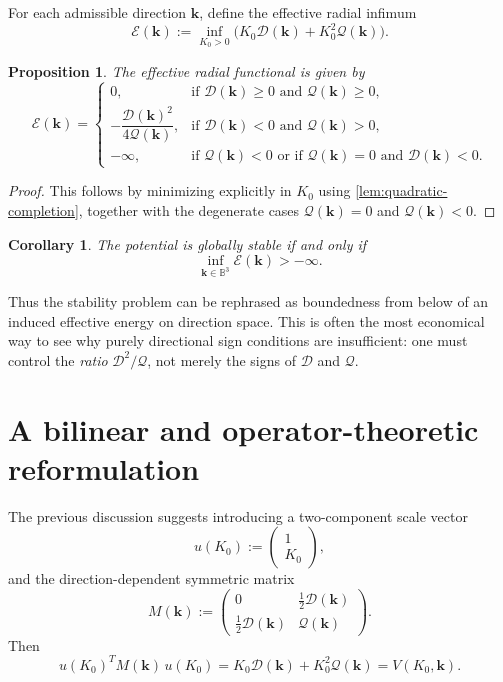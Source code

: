 \documentclass[11pt,a4paper]{article}
\newtheorem{proposition}[definition]{Proposition}
\newtheorem{corollary}[definition]{Corollary}
\newcommand{\kk}{\bm{k}}
\newcommand{\D}{\mathcal{D}}
\newcommand{\Q}{\mathcal{Q}}
\newcommand{\Sphere}{\mathbb{B}^3}
\begin{document}
	For each admissible direction \(\kk\), define the effective radial infimum
	\begin{equation}\label{eq:effective-radial}
		\mathscr{E}(\kk):=\inf_{K_0>0}\bigl(K_0\D(\kk)+K_0^2\Q(\kk)\bigr).
	\end{equation}
	
	\begin{proposition}\label{prop:effective-energy}
		The effective radial functional is given by
		\[
		\mathscr{E}(\kk)=
		\begin{cases}
			0, & \text{if }\D(\kk)\ge 0 \text{ and }\Q(\kk)\ge 0,\\[0.5em]
			-\dfrac{\D(\kk)^2}{4\Q(\kk)}, & \text{if }\D(\kk)<0 \text{ and }\Q(\kk)>0,\\[1em]
			-\infty, & \text{if }\Q(\kk)<0 \text{ or if } \Q(\kk)=0 \text{ and }\D(\kk)<0.
		\end{cases}
		\]
	\end{proposition}
	
	\begin{proof}
		This follows by minimizing explicitly in \(K_0\) using \cref{lem:quadratic-completion}, together with the degenerate cases \(\Q(\kk)=0\) and \(\Q(\kk)<0\).
	\end{proof}
	
	\begin{corollary}\label{cor:effective-energy-boundedness}
		The potential is globally stable if and only if
		\[
		\inf_{\kk\in\Sphere}\mathscr{E}(\kk)>-\infty.
		\]
	\end{corollary}
	
	Thus the stability problem can be rephrased as boundedness from below of an induced effective energy on direction space. This is often the most economical way to see why purely directional sign conditions are insufficient: one must control the \emph{ratio} \(\D^2/\Q\), not merely the signs of \(\D\) and \(\Q\).
	
	\section{A bilinear and operator-theoretic reformulation}
	
	The previous discussion suggests introducing a two-component scale vector
	\[
	u(K_0):=
	\begin{pmatrix}
		1\\
		K_0
	\end{pmatrix},
	\]
	and the direction-dependent symmetric matrix
	\begin{equation}\label{eq:direction-matrix}
		M(\kk):=
		\begin{pmatrix}
			0 & \frac12 \D(\kk)\\[0.3em]
			\frac12 \D(\kk) & \Q(\kk)
		\end{pmatrix}.
	\end{equation}
	Then
	\begin{equation}\label{eq:bilinear-form}
		u(K_0)^{\!T} M(\kk)\,u(K_0)=K_0\D(\kk)+K_0^2\Q(\kk)=V(K_0,\kk).
	\end{equation}
	
\end{document}
